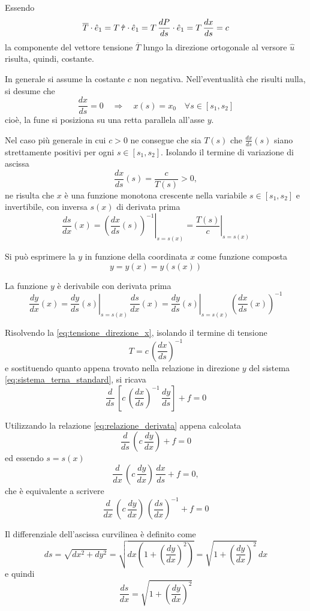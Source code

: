 Essendo
\[
\overline{T}\cdot\hat{e}_1	= T\,\hat{\tau}\cdot \hat{e}_1 = T\,\dfrac{dP}{ds}\cdot\hat{e}_1 = T\,\dfrac{dx}{ds} = c
\]
la componente del vettore tensione $\overline{T}$ lungo la direzione ortogonale al versore $\hat{u}$ risulta, quindi, costante. 

In generale si assume la costante $c$ non negativa. Nell'eventualità che risulti nulla, si desume che 
\[
\dfrac{dx}{ds} = 0	\quad \Longrightarrow \quad x(s) = x_0\quad \forall s\in[s_1, s_2]
\]  
cioè, la fune si posiziona su una retta parallela all'asse $y$.

Nel caso più generale in cui $c>0$ ne consegue che sia $T(s)$ che $\frac{dx}{ds}(s)$ siano strettamente positivi per ogni $s\in[s_1, s_2]$. Isolando il termine di variazione di ascissa 
\[
\dfrac{dx}{ds}(s) = \dfrac{c}{T(s)}	> 0,
\]
ne risulta che $x$ è una funzione monotona crescente nella variabile $s\in[s_1, s_2]$ e invertibile, con inversa $s(x)$ di derivata prima
\[
\dfrac{ds}{dx}(x)	= \left.\left(\dfrac{dx}{ds}(s)\right)^{-1}\right|_{s=s(x)} = \left.\dfrac{T(s)}{c}\right|_{s=s(x)}
\]

Si può esprimere la $y$ in funzione della coordinata $x$ come funzione composta
\[
y = y(x) = y(s(x))	
\]

La funzione $y$ è derivabile con derivata prima 
\begin{equation}
	\label{eq:relazione_derivata}
\dfrac{dy}{dx}(x) = \left.\dfrac{dy}{ds}(s)\right|_{s=s(x)}\,\dfrac{ds}{dx}(x) = \left.\dfrac{dy}{ds}(s)\right|_{s=s(x)}\,\left( \dfrac{dx}{ds}(x)\right)^{-1}
\end{equation}

Risolvendo la \eqref{eq:tensione_direzione_x}, isolando il termine di tensione
\[
T = c\,\left(\dfrac{dx}{ds}\right)^{-1}	
\]
e sostituendo quanto appena trovato nella relazione in direzione $y$ del sistema \eqref{eq:sistema_terna_standard}, si ricava
\[
\dfrac{d}{ds}\,\left[c\,\left(\dfrac{dx}{ds}\right)^{-1}\,\dfrac{dy}{ds}\right] + f = 0	
\]

Utilizzando la relazione \eqref{eq:relazione_derivata} appena calcolata 
\[
\dfrac{d}{ds}\,\left(c\,\dfrac{dy}{dx}\right) + f = 0	
\]
ed essendo $s = s(x)$ 
\[
\dfrac{d}{dx}\,\left( c\,\dfrac{dy}{dx}\right)\,\dfrac{dx}{ds} + f = 0,
\]
che è equivalente a scrivere
\[
\dfrac{d}{dx}\,\left( c\,\dfrac{dy}{dx}\right)\,\left(\dfrac{ds}{dx}\right)^{-1} + f = 0
\]

Il differenziale dell'ascissa curvilinea è definito come
\[
 ds = \sqrt{dx^2 + dy^2} = \sqrt{dx\left(1 + \left(\dfrac{dy}{dx}\right)^2\right)} = \sqrt{1 + \left(\dfrac{dy}{dx}\right)^2}\,dx
\]
e quindi
\[
\dfrac{ds}{dx} = \sqrt{1 + \left(\dfrac{dy}{dx}\right)^2}	
\]

